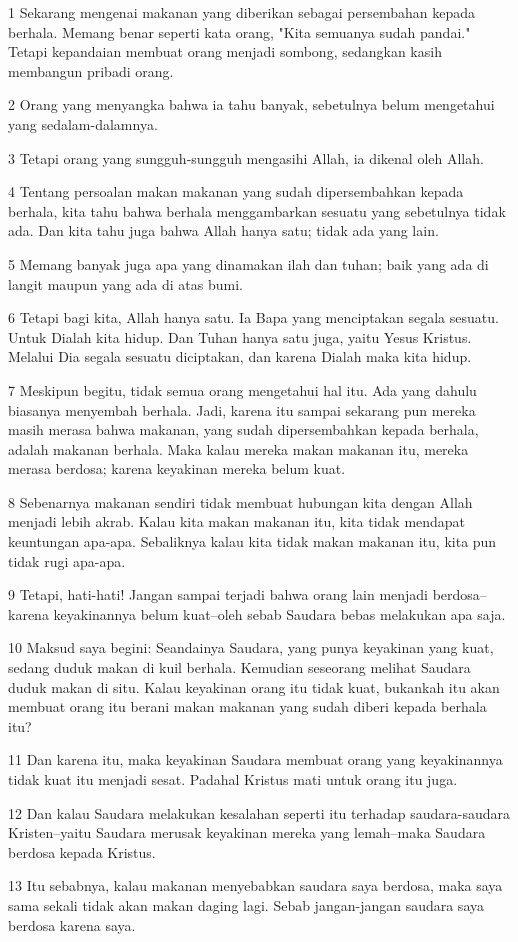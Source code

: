 \par 1 Sekarang mengenai makanan yang diberikan sebagai persembahan kepada berhala. Memang benar seperti kata orang, "Kita semuanya sudah pandai." Tetapi kepandaian membuat orang menjadi sombong, sedangkan kasih membangun pribadi orang.
\par 2 Orang yang menyangka bahwa ia tahu banyak, sebetulnya belum mengetahui yang sedalam-dalamnya.
\par 3 Tetapi orang yang sungguh-sungguh mengasihi Allah, ia dikenal oleh Allah.
\par 4 Tentang persoalan makan makanan yang sudah dipersembahkan kepada berhala, kita tahu bahwa berhala menggambarkan sesuatu yang sebetulnya tidak ada. Dan kita tahu juga bahwa Allah hanya satu; tidak ada yang lain.
\par 5 Memang banyak juga apa yang dinamakan ilah dan tuhan; baik yang ada di langit maupun yang ada di atas bumi.
\par 6 Tetapi bagi kita, Allah hanya satu. Ia Bapa yang menciptakan segala sesuatu. Untuk Dialah kita hidup. Dan Tuhan hanya satu juga, yaitu Yesus Kristus. Melalui Dia segala sesuatu diciptakan, dan karena Dialah maka kita hidup.
\par 7 Meskipun begitu, tidak semua orang mengetahui hal itu. Ada yang dahulu biasanya menyembah berhala. Jadi, karena itu sampai sekarang pun mereka masih merasa bahwa makanan, yang sudah dipersembahkan kepada berhala, adalah makanan berhala. Maka kalau mereka makan makanan itu, mereka merasa berdosa; karena keyakinan mereka belum kuat.
\par 8 Sebenarnya makanan sendiri tidak membuat hubungan kita dengan Allah menjadi lebih akrab. Kalau kita makan makanan itu, kita tidak mendapat keuntungan apa-apa. Sebaliknya kalau kita tidak makan makanan itu, kita pun tidak rugi apa-apa.
\par 9 Tetapi, hati-hati! Jangan sampai terjadi bahwa orang lain menjadi berdosa--karena keyakinannya belum kuat--oleh sebab Saudara bebas melakukan apa saja.
\par 10 Maksud saya begini: Seandainya Saudara, yang punya keyakinan yang kuat, sedang duduk makan di kuil berhala. Kemudian seseorang melihat Saudara duduk makan di situ. Kalau keyakinan orang itu tidak kuat, bukankah itu akan membuat orang itu berani makan makanan yang sudah diberi kepada berhala itu?
\par 11 Dan karena itu, maka keyakinan Saudara membuat orang yang keyakinannya tidak kuat itu menjadi sesat. Padahal Kristus mati untuk orang itu juga.
\par 12 Dan kalau Saudara melakukan kesalahan seperti itu terhadap saudara-saudara Kristen--yaitu Saudara merusak keyakinan mereka yang lemah--maka Saudara berdosa kepada Kristus.
\par 13 Itu sebabnya, kalau makanan menyebabkan saudara saya berdosa, maka saya sama sekali tidak akan makan daging lagi. Sebab jangan-jangan saudara saya berdosa karena saya.

